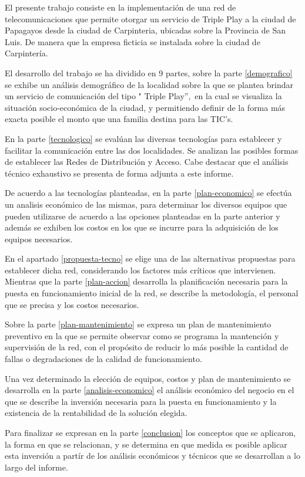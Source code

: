 El presente trabajo consiste en la implementación de una red de telecomunicaciones que permite otorgar un servicio de Triple Play a la ciudad de Papagayos desde la ciudad de Carpinteria, ubicadas sobre la Provincia de San Luis. De manera que la empresa ficticia se instalada sobre la ciudad de Carpintería.

El desarrollo del trabajo se ha dividido en 9 partes, sobre la parte \ref{demografico} se exhibe un análisis demográfico de la localidad sobre la que se plantea brindar un servicio de comunicación del tipo " Triple Play''$,$ en la cual se visualiza la situación socio-económica de la ciudad, y permitiendo definir de la forma más exacta posible el monto que una familia destina para las TIC's.

En la parte \ref{tecnologico} se evalúan las diversas tecnologías para establecer y facilitar la comunicación entre las dos localidades. Se analizan las posibles formas de establecer las Redes de  Distribución y Acceso. Cabe destacar que el análisis técnico exhaustivo se presenta de forma adjunta a este informe.

De acuerdo a las tecnologías planteadas, en la parte \ref{plan-economico} se efectúa un analisis económico de las mismas, para  determinar los diversos equipos que pueden utilizarse de acuerdo a las opciones planteadas en la parte anterior y además se exhiben los costos en los que se incurre para la adquisición de los equipos necesarios.

En el apartado \ref{propuesta-tecno} se elige una de las alternativas propuestas para establecer dicha red, considerando los factores más críticos que intervienen. Mientras que la parte \ref{plan-accion} desarrolla la planificación necesaria para la puesta en funcionamiento inicial de la red, se describe la metodología, el personal que se precisa y los costos necesarios.

Sobre la parte \ref{plan-mantenimiento} se expresa un plan de mantenimiento preventivo en la que se permite observar como se programa la mantención y supervisión de la red, con el propósito de reducir lo más posible la cantidad de fallas o degradaciones de la calidad de funcionamiento.

Una vez determinado la elección de equipos, costos y plan de mantenimiento se desarrolla en la parte \ref{analisis-economico} el análisis económico del negocio en el que se describe la inversión necesaria para la puesta en funcionamiento y la existencia de la rentabilidad de la solución elegida.

Para finalizar se expresan en la parte \ref{conclusion} los conceptos que se aplicaron, la forma en que se relacionan, y se determina en que medida es posible aplicar esta inversión a partír de los análisis económicos y técnicos que se desarrollan a lo largo del informe.
